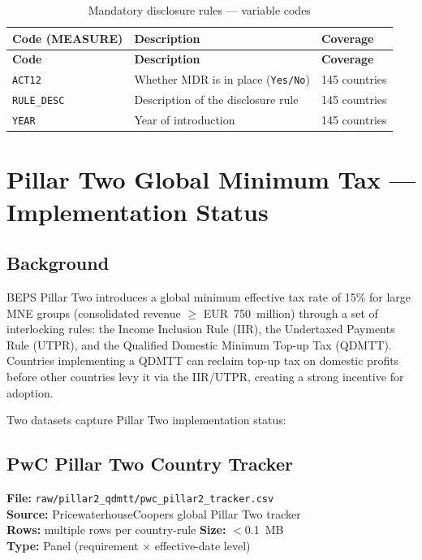 \documentclass[11pt,a4paper]{article}
\begin{document}
\begin{longtable}{L{2.8cm} L{7.0cm} C{2.5cm}}
    \caption{Mandatory disclosure rules --- variable codes}
    \label{tab:mdr}\\
    \toprule
    \textbf{Code (MEASURE)} & \textbf{Description} & \textbf{Coverage} \\
    \midrule
    \endfirsthead
    \toprule
    \textbf{Code} & \textbf{Description} & \textbf{Coverage} \\
    \midrule
    \endhead
    \bottomrule
    \endlastfoot
    \texttt{ACT12}       & Whether MDR is in place (\texttt{Yes/No}) & 145 countries \\
    \texttt{RULE\_DESC}  & Description of the disclosure rule & 145 countries \\
    \texttt{YEAR}        & Year of introduction & 145 countries \\
\end{longtable}


\section{Pillar Two Global Minimum Tax --- Implementation Status}
\label{sec:pillar2}

\subsection{Background}
\label{subsec:p2_background}

BEPS Pillar Two introduces a global minimum effective tax rate of 15\% for
large MNE groups (consolidated revenue $\geq$ EUR~750~million) through a set of
interlocking rules: the Income Inclusion Rule (IIR), the Undertaxed Payments
Rule (UTPR), and the Qualified Domestic Minimum Top-up Tax (QDMTT).  Countries
implementing a QDMTT can reclaim top-up tax on domestic profits before other
countries levy it via the IIR/UTPR, creating a strong incentive for adoption.

Two datasets capture Pillar Two implementation status:

\subsection{PwC Pillar Two Country Tracker}
\label{subsec:p2_pwc}

\textbf{File:} \texttt{raw/pillar2\_qdmtt/pwc\_pillar2\_tracker.csv}\\
\textbf{Source:} PricewaterhouseCoopers global Pillar Two tracker\\
\textbf{Rows:} multiple rows per country-rule \quad \textbf{Size:} $<$0.1~MB\\
\textbf{Type:} Panel (requirement $\times$ effective-date level)
\end{document}

